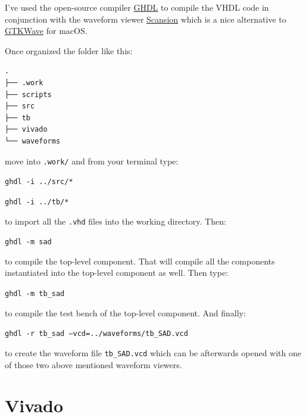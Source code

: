 \documentclass[12pt, a4paper]{article}
\begin{document}
I've used the open-source compiler \href{http://ghdl.free.fr/}{GHDL} to compile the VHDL code in conjunction with the waveform viewer \href{http://www.logicpoet.com/scansion/}{Scansion} which is a nice alternative to \href{http://gtkwave.sourceforge.net/}{GTKWave} for macOS.
\newline

Once organized the folder like this:

\begin{verbatim}
.
├── .work
├── scripts
├── src
├── tb
├── vivado
└── waveforms
\end{verbatim}

move into \texttt{.work/} and from your terminal type:
\newline

\texttt{ghdl -i ../src/*}

\texttt{ghdl -i ../tb/*}
\newline

to import all the \texttt{.vhd} files into the working directory. Then:
\newline

\texttt{ghdl -m sad}
\newline

to compile the top-level component. That will compile all the components 
instantiated into the top-level component as well. Then type:
\newline

\texttt{ghdl -m tb\_sad}
\newline

to compile the test bench of the top-level component. And finally:
\newline

\texttt{ghdl -r tb\_sad --vcd=../waveforms/tb\_SAD.vcd}
\newline

to create the waveform file \texttt{tb\_SAD.vcd} which can be afterwards opened with one of those two above mentioned waveform viewers.






\section{Vivado}
\end{document}
